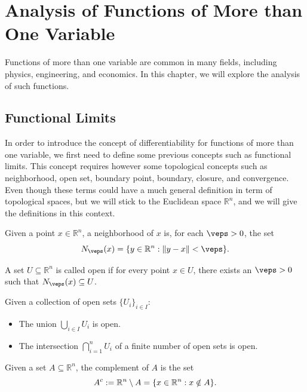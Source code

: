 \chapter{Analysis of Functions of More than One Variable}

Functions of more than one variable are common in many fields, including physics, engineering, and economics. In this chapter, we will explore the analysis of such functions.

\section{Functional Limits}

In order to introduce the concept of differentiability for functions of more than one variable, we first need to define some previous concepts such as functional limits. This concept requires however some topological concepts such as neighborhood, open set, boundary point, boundary, closure, and convergence. Even though these terms could have a much general definition in term of topological spaces, but we will stick to the Euclidean space $\mathbb{R}^n$, and we will give the definitions in this context.
\begin{definicion}[Neighborhood]
    Given a point $x \in \mathbb{R}^n$, a neighborhood of $x$ is, for each $\veps > 0$, the set
    \[
        N_\veps(x) = \{y \in \mathbb{R}^n : \|y - x\| < \veps\}.
    \]
\end{definicion}
\begin{definicion}
    A set $U \subseteq \mathbb{R}^n$ is called open if for every point $x \in U$, there exists an $\veps > 0$ such that $N_\veps(x) \subseteq U$.
\end{definicion}
\begin{prop}
    Given a collection of open sets $\{U_i\}_{i \in I}$:
    \begin{itemize}
        \item The union $\bigcup\limits_{i \in I} U_i$ is open.
        \item The intersection $\bigcap\limits_{i=1}^n U_i$ of a finite number of open sets is open.
    \end{itemize}
\end{prop}
\begin{definicion}[Complement]
    Given a set $A \subseteq \mathbb{R}^n$, the complement of $A$ is the set
    \[
        A^c := \mathbb{R}^n \setminus A = \{x \in \mathbb{R}^n : x \notin A\}.
    \]
\end{definicion}
